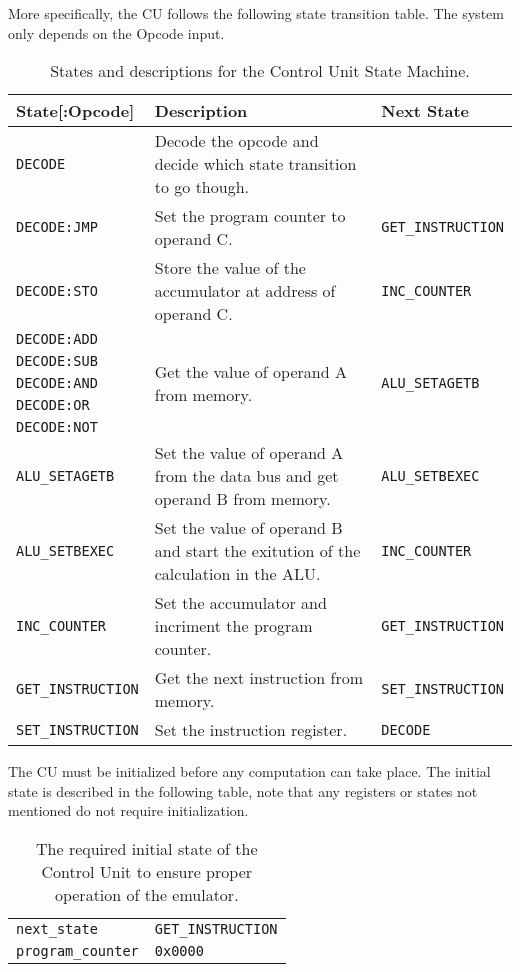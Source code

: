 \documentclass[a4paper]{article}
\begin{document}
More specifically, the CU follows the following state transition table. The system only depends on the Opcode input.

\begin{table}[H]
\centering
\caption{States and descriptions for the Control Unit State Machine.}
\begin{tabular}{p{} p{} p{}}
    State[:Opcode] & Description & Next State \\
    \hline\hline
    \verb|DECODE| & Decode the opcode and decide which state transition to go though. \\
    \verb|DECODE:JMP| & Set the program counter to operand C. & \verb|GET_INSTRUCTION| \\
    \verb|DECODE:STO| & Store the value of the accumulator at address of operand C. & \verb|INC_COUNTER| \\
    \verb|DECODE:ADD| & \multirow{5}{*}{Get the value of operand A from memory.} & \multirow{5}{*}{\texttt{ALU\_SETAGETB}} \\
    \verb|DECODE:SUB| &  & \\
    \verb|DECODE:AND| &  & \\
    \verb|DECODE:OR| &  & \\
    \verb|DECODE:NOT| &  & \\
    \hline
    \verb|ALU_SETAGETB| & Set the value of operand A from the data bus and get operand B from memory. & \verb|ALU_SETBEXEC| \\
    \hline
    \verb|ALU_SETBEXEC| & Set the value of operand B and start the exitution of the calculation in the ALU. & \verb|INC_COUNTER| \\
    \hline
    \verb|INC_COUNTER| & Set the accumulator and incriment the program counter. & \verb|GET_INSTRUCTION| \\
    \hline
    \verb|GET_INSTRUCTION| & Get the next instruction from memory. & \verb|SET_INSTRUCTION| \\
    \hline
    \verb|SET_INSTRUCTION| & Set the instruction register. & \verb|DECODE| \\
\end{tabular}
\end{table}

The CU must be initialized before any computation can take place. The initial state is described in the following table, note that any registers or states not mentioned do not require initialization.

\begin{table}[H]
\centering
\caption{The required initial state of the Control Unit to ensure proper operation of the emulator.}
\begin{tabular}{ll}
    \verb|next_state| & \verb|GET_INSTRUCTION| \\
    \verb|program_counter| & \verb|0x0000|
\end{tabular}
\end{table}
\end{document}
